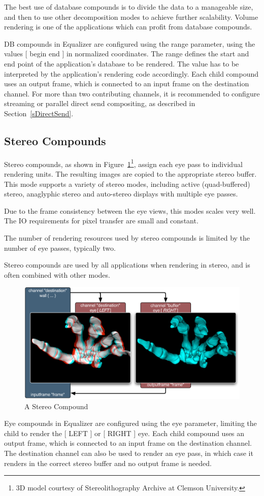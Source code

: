 \documentclass[10pt,a4]{scrartcl}
\newcommand{\fig}[1]{Figure~\ref{#1}}
\newcommand{\sref}[1]{Section~\ref{#1}}
\begin{document}
The best use of database compounds is to divide the data to a manageable
size, and then to use other decomposition modes to achieve further
scalability. Volume rendering is one of the applications which can
profit from database compounds.

DB compounds in Equalizer are configured using the \textsf{range}
parameter, using the values \textsf{[ begin end ]} in normalized
coordinates. The range defines the start and end point of the
application's database to be rendered. The value has to be interpreted
by the application's rendering code accordingly.  Each child compound
uses an output frame, which is connected to an input frame on the
destination channel. For more than two contributing channels, it is
recommended to configure streaming or parallel direct send compositing,
as described in \sref{sDirectSend}.


\subsection{Stereo Compounds}

Stereo compounds, as shown in \fig{fStereoCmp}\footnote{3D model
  courtesy of Stereolithography Archive at Clemson University.}, assign
each eye pass to individual rendering units. The resulting images are
copied to the appropriate stereo buffer. This mode supports a variety of
stereo modes, including active (quad-buffered) stereo, anaglyphic stereo
and auto-stereo displays with multiple eye passes.

Due to the frame consistency between the eye views, this modes scales
very well. The IO requirements for pixel transfer are small and
constant.

The number of rendering resources used by stereo compounds is limited by
the number of eye passes, typically two. 

Stereo compounds are used by all applications when rendering in stereo,
and is often combined with other modes.

\begin{figure}
  \includegraphics[width=.618\textwidth]{images/EYE.pdf}
  {\caption{\label{fStereoCmp}\small A Stereo Compound}}
\end{figure}
Eye compounds in Equalizer are configured using the \textsf{eye}
parameter, limiting the child to render the \textsf{[ LEFT ]} or
\textsf{[ RIGHT ]} eye. Each child compound uses an output frame, which
is connected to an input frame on the destination channel. The
destination channel can also be used to render an eye pass, in which case
it renders in the correct stereo buffer and no output frame is needed.
\end{document}
